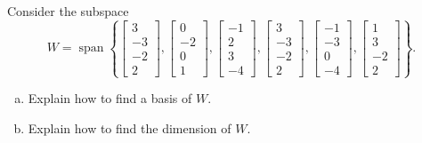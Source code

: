 
\begin{exerciseStatement}


Consider the subspace \[W=\operatorname{span}  \left\{ \left[\begin{array}{c}
3 \\
-3 \\
-2 \\
2
\end{array}\right] , \left[\begin{array}{c}
0 \\
-2 \\
0 \\
1
\end{array}\right] , \left[\begin{array}{c}
-1 \\
2 \\
3 \\
-4
\end{array}\right] , \left[\begin{array}{c}
3 \\
-3 \\
-2 \\
2
\end{array}\right] , \left[\begin{array}{c}
-1 \\
-3 \\
0 \\
-4
\end{array}\right] , \left[\begin{array}{c}
1 \\
3 \\
-2 \\
2
\end{array}\right] \right\} .\]


\begin{enumerate}[(a)]
\item  Explain how to find a basis of \(W\).
\item  Explain how to find the dimension of \(W\).
\end{enumerate}
    
\end{exerciseStatement}
    
